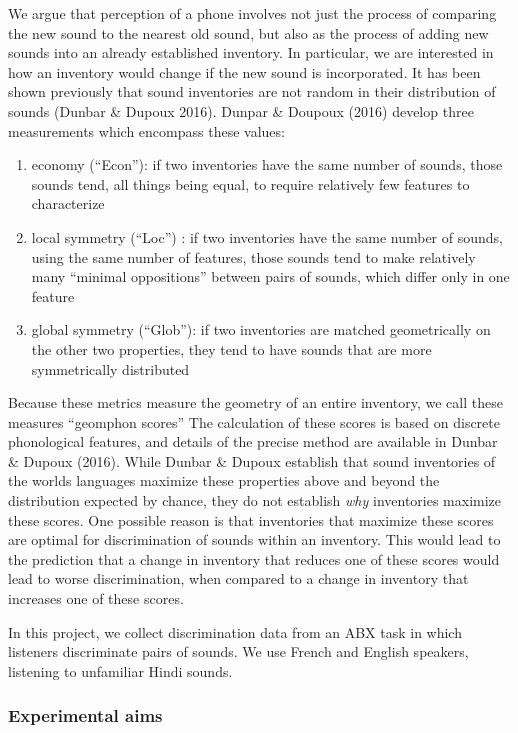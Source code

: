\documentclass[]{article}
\begin{document}
We argue that perception of a phone involves not just the process of
comparing the new sound to the nearest old sound, but also as the
process of adding new sounds into an already established inventory. In
particular, we are interested in how an inventory would change if the
new sound is incorporated. It has been shown previously that sound
inventories are not random in their distribution of sounds (Dunbar \&
Dupoux 2016). Dunpar \& Doupoux (2016) develop three measurements which
encompass these values:

\begin{enumerate}
\def\labelenumi{\arabic{enumi})}
\item
  economy (``Econ''): if two inventories have the same number of sounds,
  those sounds tend, all things being equal, to require relatively few
  features to characterize
\item
  local symmetry (``Loc'') : if two inventories have the same number of
  sounds, using the same number of features, those sounds tend to make
  relatively many ``minimal oppositions'' between pairs of sounds, which
  differ only in one feature
\item
  global symmetry (``Glob''): if two inventories are matched
  geometrically on the other two properties, they tend to have sounds
  that are more symmetrically distributed
\end{enumerate}

Because these metrics measure the geometry of an entire inventory, we
call these measures ``geomphon scores'' The calculation of these scores
is based on discrete phonological features, and details of the precise
method are available in Dunbar \& Dupoux (2016). While Dunbar \& Dupoux
establish that sound inventories of the worlds languages maximize these
properties above and beyond the distribution expected by chance, they do
not establish \emph{why} inventories maximize these scores. One possible
reason is that inventories that maximize these scores are optimal for
discrimination of sounds within an inventory. This would lead to the
prediction that a change in inventory that reduces one of these scores
would lead to worse discrimination, when compared to a change in
inventory that increases one of these scores.

In this project, we collect discrimination data from an ABX task in
which listeners discriminate pairs of sounds. We use French and English
speakers, listening to unfamiliar Hindi sounds.

\hypertarget{experimental-aims}{%
\subsubsection{Experimental aims}\label{experimental-aims}}
\end{document}
